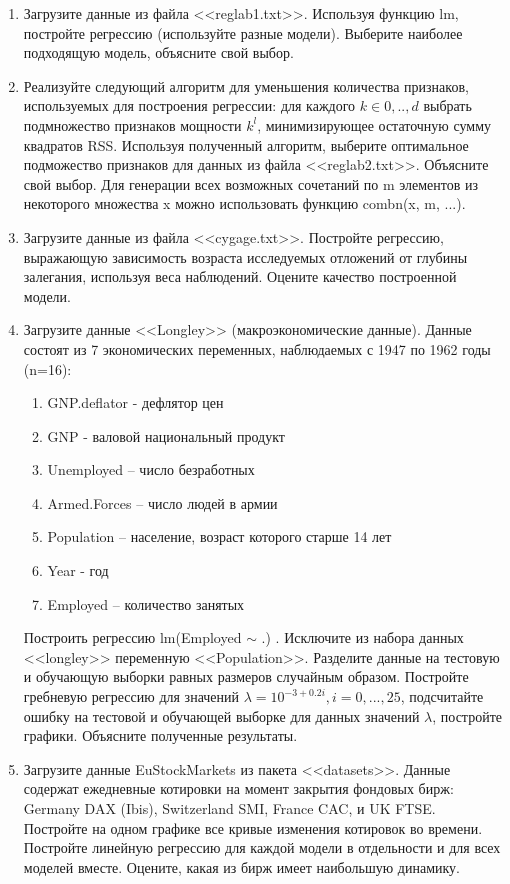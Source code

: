 \documentclass[]{article}
\numberwithin{equation}{section}
\begin{document}
    \begin{enumerate}
        \item Загрузите данные из файла <<reglab1.txt>>. Используя функцию lm, постройте регрессию (используйте разные модели). Выберите наиболее подходящую модель, объясните свой выбор.
        \item Реализуйте следующий алгоритм для уменьшения количества признаков, используемых для построения регрессии: для каждого $k \in {0,..,d}$ выбрать подмножество признаков мощности $k^{l}$, минимизирующее остаточную сумму квадратов RSS. Используя полученный алгоритм, выберите оптимальное подможество признаков для данных из файла <<reglab2.txt>>. Объясните свой выбор. Для генерации всех возможных сочетаний по m элементов из некоторого множества x можно использовать функцию combn(x, m, ...).
        \item Загрузите данные из файла <<cygage.txt>>. Постройте регрессию, выражающую зависимость возраста исследуемых отложений от глубины залегания, используя веса наблюдений. Оцените качество построенной модели.
        \item Загрузите данные <<Longley>> (макроэкономические данные). Данные состоят из 7 экономических переменных, наблюдаемых с 1947 по 1962 годы (n=16):
            \begin{enumerate}
                \item GNP.deflator - дефлятор цен
                \item GNP - валовой национальный продукт
                \item Unemployed – число безработных
                \item Armed.Forces – число людей в армии
                \item Population – население, возраст которого старше 14 лет
                \item Year - год
                \item Employed – количество занятых
            \end{enumerate}
        Построить регрессию lm(Employed $\sim$ .) .
        Исключите из набора данных <<longley>> переменную <<Population>>. Разделите данные на тестовую и обучающую выборки равных размеров случайным образом. Постройте гребневую регрессию для значений $\lambda = 10^{-3 + 0.2 i}, i = 0,...,25$, подсчитайте ошибку на тестовой и обучающей выборке для данных значений $\lambda$, постройте графики. Объясните полученные результаты.
        \item Загрузите данные EuStockMarkets из пакета <<datasets>>. Данные содержат ежедневные котировки на момент закрытия фондовых бирж: Germany DAX (Ibis), Switzerland SMI, France CAC, и UK FTSE. Постройте на одном графике все кривые изменения котировок во времени. Постройте линейную регрессию для каждой модели в отдельности и для всех моделей вместе. Оцените, какая из бирж имеет наибольшую динамику.

\end{enumerate}
\end{document}
